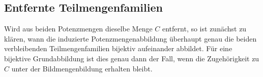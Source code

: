 \documentclass[main.tex]{subfiles}
\begin{document}
\begin{tabproofwide}
\end{tabproofwide}

\subsection{Entfernte Teilmengenfamilien}

Wird aus beiden Potenzmengen dieselbe Menge \(C\) entfernt, so ist zunächst
zu klären, wann die induzierte Potenzmengenabbildung überhaupt genau die
beiden verbleibenden Teilmengenfamilien bijektiv aufeinander abbildet. Für
eine bijektive Grundabbildung ist dies genau dann der Fall, wenn die
Zugehörigkeit zu \(C\) unter der Bildmengenbildung erhalten bleibt.
\end{document}
